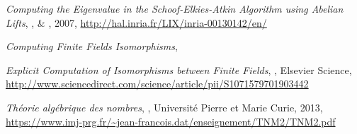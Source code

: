 \documentclass[a4paper]{article} %
\numberwithin{section}{part}
\numberwithin{equation}{section}
\begin{document}
\begin{thebibliography}{LC}
 \emph{Computing the Eigenvalue in the Schoof-Elkies-Atkin
Algorithm using Abelian Lifts}, ,  \&
, 2007, 
\url{http://hal.inria.fr/LIX/inria-00130142/en/}

 \emph{Computing Finite Fields Isomorphisms}, 

 \emph{Explicit Computation of Isomorphisms between Finite
Fields}, , Elsevier Science, 
\url{http://www.sciencedirect.com/science/article/pii/S1071579701903442}

 \emph{Théorie algébrique des nombres}, ,
Université Pierre et Marie Curie, 2013, 
\url{https://www.imj-prg.fr/~jean-francois.dat/enseignement/TNM2/TNM2.pdf}

\end{thebibliography}
\end{document}
